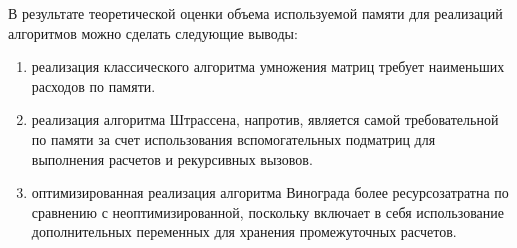 В результате теоретической оценки объема используемой памяти для реализаций 
алгоритмов можно сделать следующие выводы:
\begin{enumerate}
	\item реализация классического алгоритма умножения матриц требует наименьших расходов по памяти.
	\item реализация алгоритма Штрассена, напротив, является самой требовательной по памяти за счет использования вспомогательных подматриц для выполнения расчетов и рекурсивных вызовов.
	\item оптимизированная реализация алгоритма Винограда более ресурсозатратна по сравнению с неоптимизированной, поскольку включает в себя использование дополнительных переменных для хранения промежуточных расчетов.
\end{enumerate}